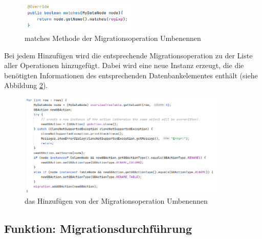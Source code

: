 	\begin{figure}[h]
		\centering
		\includegraphics[width=0.5\textwidth]{images/ui/matches}
		\caption{matches Methode der Migrationsoperation Umbenennen}
		\label{img:ui:matches}
	\end{figure}
	Bei jedem Hinzufügen wird die entsprechende Migrationsoperation zu der Liste aller Operationen hinzugefügt. Dabei wird eine neue Instanz erzeugt, die die benötigten Informationen des entsprechenden Datenbankelementes enthält (siehe Abbildung \ref{img:ui:overviewAddRenameSrc}).
	\begin{figure}[H]
		\centering
		\includegraphics[width=0.9\textwidth]{images/ui/overviewAddRenameSrc}
		\caption{das Hinzufügen von der Migrationsoperation Umbenennen}
		\label{img:ui:overviewAddRenameSrc}
	\end{figure}
\subsection{Funktion: Migrationsdurchführung}
	
